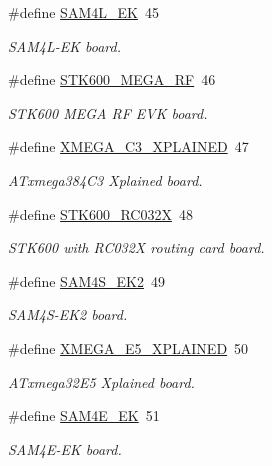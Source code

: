\begin{DoxyCompactItemize}
\#define \mbox{\hyperlink{group__group__common__boards_ga28f30a48578d189acda09784bc5fabc8}{S\+A\+M4\+L\+\_\+\+EK}}~45
\begin{DoxyCompactList}\small\item\em S\+A\+M4\+L-\/\+EK board. \end{DoxyCompactList}\item 
\#define \mbox{\hyperlink{group__group__common__boards_ga7c1887e7b82fa3c46a3ed04ec1dcee3e}{S\+T\+K600\+\_\+\+M\+E\+G\+A\+\_\+\+RF}}~46
\begin{DoxyCompactList}\small\item\em S\+T\+K600 M\+E\+GA RF E\+VK board. \end{DoxyCompactList}\item 
\#define \mbox{\hyperlink{group__group__common__boards_ga8224cc63d7af89624b477011ff52ff91}{X\+M\+E\+G\+A\+\_\+\+C3\+\_\+\+X\+P\+L\+A\+I\+N\+ED}}~47
\begin{DoxyCompactList}\small\item\em A\+Txmega384\+C3 Xplained board. \end{DoxyCompactList}\item 
\#define \mbox{\hyperlink{group__group__common__boards_ga656cc8303b1e70eb2ed57a1931da2353}{S\+T\+K600\+\_\+\+R\+C032X}}~48
\begin{DoxyCompactList}\small\item\em S\+T\+K600 with R\+C032X routing card board. \end{DoxyCompactList}\item 
\#define \mbox{\hyperlink{group__group__common__boards_ga588503ce59af4ecd9eb92c589ce36f57}{S\+A\+M4\+S\+\_\+\+E\+K2}}~49
\begin{DoxyCompactList}\small\item\em S\+A\+M4\+S-\/\+E\+K2 board. \end{DoxyCompactList}\item 
\#define \mbox{\hyperlink{group__group__common__boards_ga6f44c923ab25a96e4de1f389101fae63}{X\+M\+E\+G\+A\+\_\+\+E5\+\_\+\+X\+P\+L\+A\+I\+N\+ED}}~50
\begin{DoxyCompactList}\small\item\em A\+Txmega32\+E5 Xplained board. \end{DoxyCompactList}\item 
\#define \mbox{\hyperlink{group__group__common__boards_ga98d89841c87da3d8358691862e51d814}{S\+A\+M4\+E\+\_\+\+EK}}~51
\begin{DoxyCompactList}\small\item\em S\+A\+M4\+E-\/\+EK board. \end{DoxyCompactList}\item 

\end{DoxyCompactItemize}
